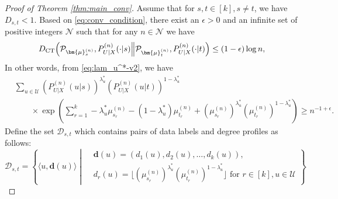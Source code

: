 \documentclass[11pt]{article}
\theoremstyle{plain}
\theoremstyle{definition}
\begin{document}
\begin{proof}[Proof of Theorem \ref{thm:main_conv}]
Assume that for $s,t \in [k], s \neq t$, we have $D_{s,t} < 1$. Based on \eqref{eq:conv_condition}, there exist
an $\epsilon >0$ and an infinite set of positive integers $\mathcal{N}$ such that for any $n \in \mathcal{N}$ we have
\[
D_{\mathrm{CT}}\Bigl(\mathcal{P}_{\bm{\mu}_s^{(n)}}, P^{(n)}_{U|X}(\cdot|s) \Big\|  \mathcal{P}_{\bm{\mu}_t^{(n)}}, P^{(n)}_{U|X}(\cdot|t) \Bigr)
\le (1 - \epsilon) \log n,
\]
In other words, from \eqref{eq:lam_u^*-v2}, we have
\begin{align}
&\sum_{u \in \mathcal{U}}
 (P^{(n)}_{U|X}(u|s))^{\lambda_u^*}  
 (P^{(n)}_{U|X}(u|t))^{1-\lambda_u^*} \nonumber \\
&\quad\quad \times \exp\left(
 \sum_{r=1}^k  -\lambda_u^* \mu_{s_r}^{(n)} - 
(1-\lambda_u^*) \mu_{t_r}^{(n)}  + (\mu_{s_r}^{(n)})^{\lambda_u^*} (\mu_{t_r}^{(n)})^{1-\lambda_u^*}
\right) \ge n^{-1+\epsilon}.
\label{eq:-1+ep}
\end{align}
Define the set $\mathcal{D}_{s,t}$ which contains pairs of
data labels and degree profiles as follows:
\[
\mathcal{D}_{s,t} = \left\{ \langle u, \mathbf{d}(u) \rangle \middle| 
\begin{aligned}
	&\mathbf{d}(u) = (d_1(u),d_2(u),\ldots, d_k(u)), \\
	  & d_r(u) = \lfloor (\mu_{s_r}^{(n)})^{\lambda_u^*} (\mu_{t_r}^{(n)})^{1-\lambda_u^*} \rfloor \text{ for }
	r \in [k], u \in \mathcal{U}
\end{aligned}
\right\}
\]


\end{proof}
\end{document}
